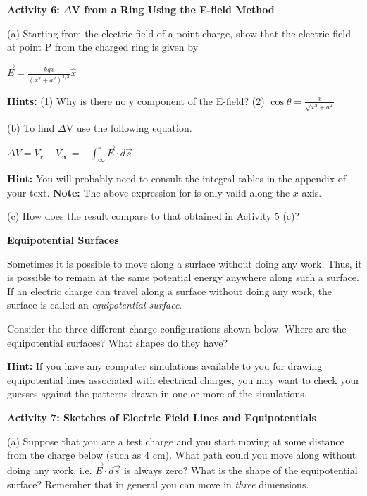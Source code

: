 \textbf{Activity 6: \( \Delta  \)V from a Ring Using the E-field
Method}

(a) Starting from the electric field of a point charge, show that
the electric field at point P from the charged ring is given by

{\centering \( \overrightarrow{E}=\frac{kqx}{(x^{2}+a^{2})^{3/2}}\hat{x} \)\par}

\textbf{Hints:} (1) Why is there no y component of the E-field? (2)
\( \cos \theta =\frac{x}{\sqrt{x^{2}+a^{2}}} \)
\vspace{30mm}

(b) To find \( \Delta  \)V use the following equation.

{\centering \( \Delta V=V_{r}-V_{\infty }=-\int ^{r}_{\infty }\overrightarrow{E}\cdot d\overrightarrow{s} \)\par}
\textbf{Hint:} You will probably need to consult the integral tables in the appendix of your text.
\textbf{Note:} The above expression for  is only valid along the $x$-axis.
\vspace{30mm}

(c) How does the result compare to that obtained in Activity 5 (c)?
\vspace{30mm}

\textbf{Equipotential Surfaces}

Sometimes it is possible to move along a surface without doing any
work. Thus, it is possible to remain at the same potential energy
anywhere along such a surface. If an electric charge can travel along
a surface without doing any work, the surface is called an \emph{equipotential
surface}.

Consider the three different charge configurations shown below. Where
are the equipotential surfaces? What shapes do they have?

\textbf{Hint:} If you have any computer simulations available to you
for drawing equipotential lines associated with electrical charges,
you may want to check your guesses against the patterns drawn in one
or more of the simulations.

\textbf{Activity 7: Sketches of Electric Field Lines and Equipotentials}

(a) Suppose that you are a test charge and you start moving at some
distance from the charge below (such as 4 cm). What path could you
move along without doing any work, i.e. \( \overrightarrow{E}\cdot d\overrightarrow{s} \)
is always zero? What is the shape of the equipotential surface? Remember
that in general you can move in \emph{three} dimensions.

